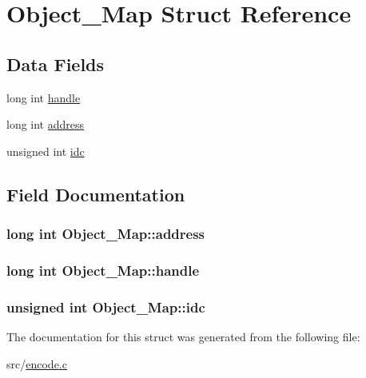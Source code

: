 \hypertarget{structObject__Map}{\section{\-Object\-\_\-\-Map \-Struct \-Reference}
\label{structObject__Map}
}
\subsection*{\-Data \-Fields}
\begin{DoxyCompactItemize}
\item 
long int \hyperlink{structObject__Map_ac2134941ab9a568bc17e7c810363c979}{handle}
\item 
long int \hyperlink{structObject__Map_ac0882a58bf44781075581d45c137e025}{address}
\item 
unsigned int \hyperlink{structObject__Map_ae7286ff4bdea1dabaf600e87935baf7d}{idc}
\end{DoxyCompactItemize}


\subsection{\-Field \-Documentation}
\hypertarget{structObject__Map_ac0882a58bf44781075581d45c137e025}{
\subsubsection[{address}]{\setlength{\rightskip}{0pt plus 5cm}long int {\bf \-Object\-\_\-\-Map\-::address}}}\label{structObject__Map_ac0882a58bf44781075581d45c137e025}
\hypertarget{structObject__Map_ac2134941ab9a568bc17e7c810363c979}{
\subsubsection[{handle}]{\setlength{\rightskip}{0pt plus 5cm}long int {\bf \-Object\-\_\-\-Map\-::handle}}}\label{structObject__Map_ac2134941ab9a568bc17e7c810363c979}
\hypertarget{structObject__Map_ae7286ff4bdea1dabaf600e87935baf7d}{
\subsubsection[{idc}]{\setlength{\rightskip}{0pt plus 5cm}unsigned int {\bf \-Object\-\_\-\-Map\-::idc}}}\label{structObject__Map_ae7286ff4bdea1dabaf600e87935baf7d}


\-The documentation for this struct was generated from the following file\-:\begin{DoxyCompactItemize}
\item 
src/\hyperlink{encode_8c}{encode.\-c}\end{DoxyCompactItemize}
